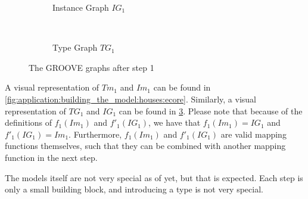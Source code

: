 \begin{figure}[p]
    \centering
    \begin{subfigure}{0.98\textwidth}
        \centering
        
        \caption{Instance Graph $IG_1$}
        \label{fig:application:building_the_model:houses:groove:instance_graph}
    \end{subfigure}
    \\
    \begin{subfigure}{0.98\textwidth}
        \centering
        
        \caption{Type Graph $TG_1$}
        \label{fig:application:building_the_model:houses:groove:type_graph}
    \end{subfigure}
    \caption{The GROOVE graphs after step 1}
    \label{fig:application:building_the_model:houses:groove}
\end{figure}

A visual representation of $Tm_1$ and $Im_1$ can be found in \cref{fig:application:building_the_model:houses:ecore}. Similarly, a visual representation of $TG_1$ and $IG_1$ can be found in \cref{fig:application:building_the_model:houses:groove}. Please note that because of the definitions of $f_1(Im_1)$ and $f'_1(IG_1)$, we have that $f_1(Im_1) = IG_1$ and $f'_1(IG_1) = Im_1$. Furthermore, $f_1(Im_1)$ and $f'_1(IG_1)$ are valid mapping functions themselves, such that they can be combined with another mapping function in the next step.

The models itself are not very special as of yet, but that is expected. Each step is only a small building block, and introducing a type is not very special.

\afterpage{\FloatBarrier}